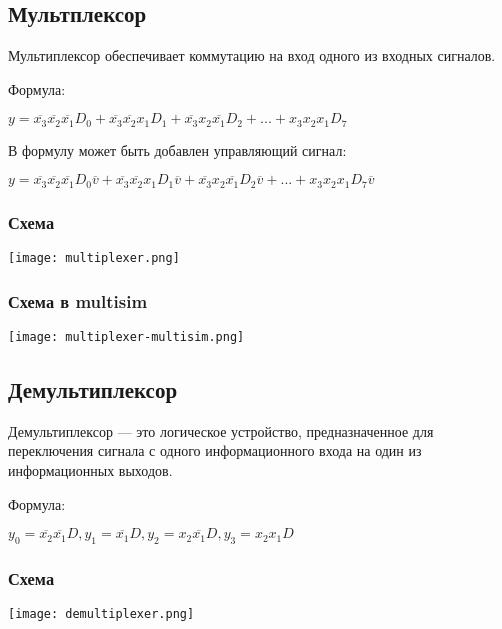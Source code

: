\documentclass{article}
\begin{document}
\begin{flushleft}
\subsection{Мультплексор}

Мультиплексор обеспечивает коммутацию на вход одного из входных сигналов.

Формула:

$y = \overline{x_3}\overline{x_2}\overline{x_1}D_0 + \overline{x_3}\overline{x_2}x_1D_1 + \overline{x_3}x_2\overline{x_1}D_2 + ... + x_3x_2x_1D_7$

\hfill

В формулу может быть добавлен управляющий сигнал:

$y = \overline{x_3}\overline{x_2}\overline{x_1}D_0\overline{v} + \overline{x_3}\overline{x_2}x_1D_1\overline{v} + \overline{x_3}x_2\overline{x_1}D_2\overline{v} + ... + x_3x_2x_1D_7\overline{v}$

\subsubsection{Схема}

\texttt{[image: multiplexer.png]}

\subsubsection{Схема в multisim}

\texttt{[image: multiplexer-multisim.png]}

\subsection{Демультиплексор}

Демультиплексор — это логическое устройство, предназначенное для переключения сигнала с одного информационного входа на один из информационных выходов.

\hfill

Формула:

$y_0 = \overline{x_2} \overline{x_1} D, y_1 = \overline{x_1}D, y_2 = x_2\overline{x_1}D, y_3 = x_2 x_1 D$

\subsubsection{Схема}

\texttt{[image: demultiplexer.png]}

\end{flushleft}
\end{document}
